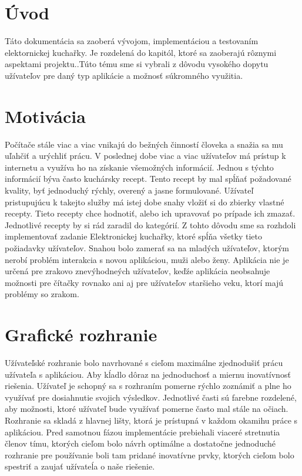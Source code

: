 \documentclass[12pt,a4paper,titlepage,final]{article}
\begin{document}


\tableofcontents
\newpage

\section{Úvod}
Táto dokumentácia sa zaoberá vývojom, implementáciou a testovaním elektornickej kuchařky. Je rozdelená do kapitól, ktoré sa zaoberajú rôznymi aspektami projektu.\cite{Prokop:Algoritmy}.Túto tému sme si vybrali z dôvodu vysokého dopytu užívateľov pre daný typ aplikácie a možnosť súkromného využitia. 


\section{Motivácia}
Počítače stále viac a viac vnikajú do bežných činností človeka a snažia sa mu uľahčiť a urýchliť prácu. V poslednej dobe viac a viac užívateľov má prístup k internetu a využíva ho na získanie všemožných informácií. Jednou s týchto informácií býva často kuchársky recept. Tento recept by mal spĺňať požadované kvality, byť jednoduchý rýchly, overený a jasne formulované. Užívateľ pristupujúcu k takejto služby má istej dobe snahy vložiť si do zbierky vlastné recepty. Tieto recepty chce hodnotiť, alebo ich upravovať po prípade ich zmazať. Jednotlivé recepty by si rád zaradil do kategórií. Z tohto dôvodu sme sa rozhdoli implementovať zadanie Elektronickej kuchařky, ktoré spĺňa všetky tieto požiadavky užívateľov. Snahou bolo zamerať sa na mladých užívateľov, ktorým nerobí problém interakcia s novou aplikáciou, muži alebo ženy. Aplikácia nie je určená pre zrakovo znevýhodneých užívateľov, keďźe aplikácia neobsahuje možnosti pre čítačky rovnako ani aj pre užívateľov staršieho veku, ktorí majú problémy so zrakom.

\section{Grafické rozhranie}
Užívateľské rozhranie bolo navrhované s cieľom maximálne zjednodušiť prácu užívateľa s aplikáciou. Aby kĺadlo dôraz na jednoduchosť a miernu inovatívnosť riešenia. Užívateľ je schopný sa s rozhraním pomerne rýchlo zoznámiť a plne ho využívať pre dosiahnutie svojich výsledkov. Jednotlivé časti sú farebne rozdelené, aby možnosti, ktoré užívateľ bude využívať pomerne často mal stále na očiach. Rozhranie sa skladá z hlavnej lišty, ktorá je prístupná v každom okamihu práce s aplikáciou. Pred samotnou fázou implementácie prebiehali viaceré stretnutia členov tímu, ktorých cieľom bolo návrh optimálne a dostatočne jednoduché rozhranie pre používanie boli tam pridané inovatívne prvky, ktorých cieľom bolo spestriť a zaujať užívateĺa o naše riešenie.\cite{Stephne:Rozhrania}
\end{document}
